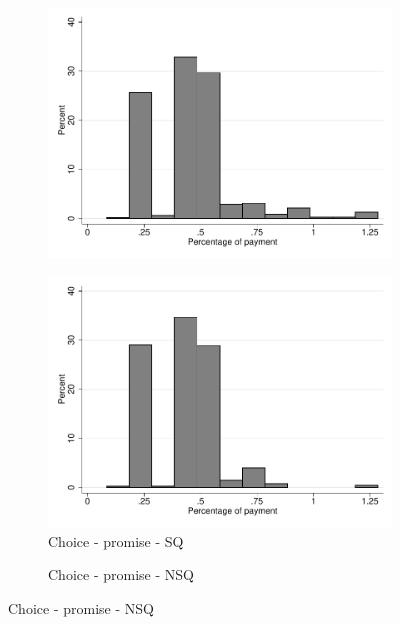 \documentclass[11pt]{article}
\begin{document}
\begin{figure}[H]
\begin{center}
\begin{subfigure}{.31\textwidth}
        \includegraphics[width=\textwidth]{Figuras/hist_porc_pay_cond_pro_5.pdf}
    \end{subfigure}  
     \begin{subfigure}{.31\textwidth}
    \caption{Choice - promise - SQ}
        \centering
        \includegraphics[width=\textwidth]{Figuras/hist_porc_pay_cond_pro_8.pdf}
    \end{subfigure}    
     \begin{subfigure}{.31\textwidth}
    \caption{Choice - promise - NSQ}
        \centering

\end{subfigure}
\end{center}
\end{figure}
\end{document}
